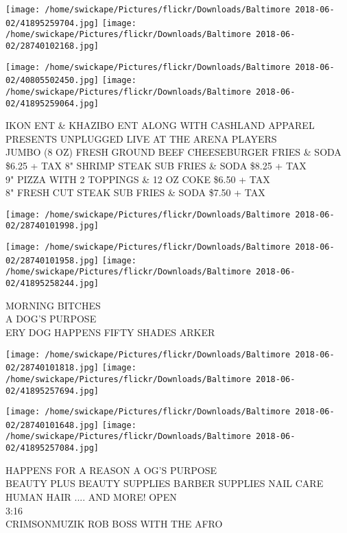 \documentclass[10pt,letterpaper]{article}
\begin{document}
\texttt{[image: /home/swickape/Pictures/flickr/Downloads/Baltimore 2018-06-02/41895259704.jpg]}
\texttt{[image: /home/swickape/Pictures/flickr/Downloads/Baltimore 2018-06-02/28740102168.jpg]}

\texttt{[image: /home/swickape/Pictures/flickr/Downloads/Baltimore 2018-06-02/40805502450.jpg]}
\texttt{[image: /home/swickape/Pictures/flickr/Downloads/Baltimore 2018-06-02/41895259064.jpg]}

IKON ENT \& KHAZIBO ENT ALONG WITH CASHLAND APPAREL PRESENTS UNPLUGGED LIVE AT THE ARENA PLAYERS\\
JUMBO (8 OZ) FRESH GROUND BEEF CHEESEBURGER FRIES \& SODA \$6.25 + TAX 8" SHRIMP STEAK SUB FRIES \& SODA \$8.25 + TAX\\
9" PIZZA WITH 2 TOPPINGS \& 12 OZ COKE \$6.50 + TAX\\
8" FRESH CUT STEAK SUB FRIES \& SODA \$7.50 + TAX\\
\pagebreak

\texttt{[image: /home/swickape/Pictures/flickr/Downloads/Baltimore 2018-06-02/28740101998.jpg]}

\vspace{0.25in}
\texttt{[image: /home/swickape/Pictures/flickr/Downloads/Baltimore 2018-06-02/28740101958.jpg]}
\texttt{[image: /home/swickape/Pictures/flickr/Downloads/Baltimore 2018-06-02/41895258244.jpg]}

MORNING BITCHES\\
A DOG'S PURPOSE\\
ERY DOG HAPPENS FIFTY SHADES ARKER\\
\pagebreak

\texttt{[image: /home/swickape/Pictures/flickr/Downloads/Baltimore 2018-06-02/28740101818.jpg]}
\texttt{[image: /home/swickape/Pictures/flickr/Downloads/Baltimore 2018-06-02/41895257694.jpg]}

\texttt{[image: /home/swickape/Pictures/flickr/Downloads/Baltimore 2018-06-02/28740101648.jpg]}
\texttt{[image: /home/swickape/Pictures/flickr/Downloads/Baltimore 2018-06-02/41895257084.jpg]}

HAPPENS FOR A REASON A OG'S PURPOSE\\
BEAUTY PLUS BEAUTY SUPPLIES BARBER SUPPLIES NAIL CARE HUMAN HAIR .... AND MORE!  OPEN\\
3:16\\
CRIMSONMUZIK ROB BOSS WITH THE AFRO\\
\pagebreak
\end{document}
